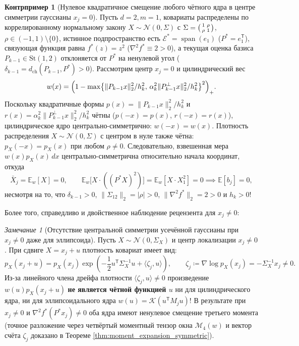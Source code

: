 \documentclass[11pt,a4paper]{article}
\newcommand{\E}{\mathbb{E}}
\newcommand{\T}{^{\mathsf{T}}}
\newcommand{\St}{\mathrm{St}}
\newcommand{\Kern}{\mathcal{K}}
\newcommand{\PEDRs}{P^{*}}
\DeclareMathOperator{\spanop}{span}
\theoremstyle{definition}
\newtheorem{counterexample}[theorem]{Контрпример}
\theoremstyle{remark}
\newtheorem{remark}[theorem]{Замечание}
\begin{document}
\begin{counterexample}[Нулевое квадратичное смещение любого чётного ядра в центре симметрии гауссианы $x_j = 0$]\label{cex:cyl_zero_bias}
Пусть $d = 2, m = 1$, ковариаты распределены по коррелированному нормальному закону $X \sim \mathcal{N}(0, \Sigma)$ с $\Sigma = \begin{psmallmatrix} 1 & \rho \\ \rho & 1 \end{psmallmatrix}$, $\rho \in (-1, 1) \setminus \{0\}$, истинное подпространство есть $\mathcal{E}^* = \spanop(e_1)$ ($\PEDRs = e_1\T$), связующая функция равна $f^*(z) = z^2$ ($\nabla^2 f^* \equiv 2 > 0$), а текущая оценка базиса $P_{k-1} \in \St(1,2)$ отклоняется от $\PEDRs$ на ненулевой угол ($\delta_{k-1} = d_{\mathrm{ch}}(P_{k-1}, \PEDRs) > 0$). Рассмотрим центр $x_j = 0$ и цилиндрический вес
\[
    w(x) = \Bigl(1 - \max\bigl\{\|P_{k-1}x\|_2^2 / h_k^2, \, \alpha_k^2 \|P_{k-1}^\perp x\|_2^2 / h_k^2\bigr\}^2\Bigr)_+.
\]
Поскольку квадратичные формы $p(x) = \|P_{k-1}x\|_2^2/h_k^2$ и $r(x) = \alpha_k^2\|P_{k-1}^\perp x\|_2^2/h_k^2$ чётны ($p(-x)=p(x)$, $r(-x)=r(x)$), цилиндрическое ядро центрально-симметрично: $w(-x) = w(x)$. Плотность распределения $X \sim \mathcal{N}(0, \Sigma)$ с центром в нуле также чётна: $p_X(-x) = p_X(x)$ при любом $\rho \neq 0$. Следовательно, взвешенная мера $w(x)p_X(x)\,dx$ центрально-симметрична относительно начала координат, откуда
\[
    \bar{X}_j = \E_w[X] = 0, \qquad \E_w\bigl[X \cdot ((\PEDRs X)^2)\bigr] = \E_w[X \cdot X_1^2] = 0 \implies \E[b_j] = 0,
\]
несмотря на то, что $\delta_{k-1} > 0$, $\|\Sigma_{12}\|_2 = |\rho| > 0$, $\|\nabla^2 f^*\|_2 = 2 > 0$ и $h_k > 0$!
\end{counterexample}

Более того, справедливо и двойственное наблюдение рецензента для $x_j \neq 0$:
\begin{remark}[Отсутствие центральной симметрии усечённой гауссианы при $x_j \neq 0$ даже для эллипсоида]
Пусть $X \sim \mathcal{N}(0, \Sigma_X)$ и центр локализации $x_j \neq 0$. При сдвиге $X = x_j + u$ плотность ковариат имеет вид:
\begin{equation}\label{eq:shifted_gaussian_density}
    p_X(x_j + u) = p_X(x_j) \exp\left(-\frac{1}{2}u\T \Sigma_X^{-1} u + \langle \zeta_j, u \rangle\right), \qquad \zeta_j \coloneqq \nabla \log p_X(x_j) = -\Sigma_X^{-1} x_j \neq 0.
\end{equation}
Из-за линейного члена дрейфа плотности $\langle \zeta_j, u \rangle \neq 0$ произведение $w(u) p_X(x_j + u)$ \textbf{не является чётной функцией $u$} ни для цилиндрического ядра, ни для эллипсоидального ядра $w(u) = \Kern(u\T M_j u)$! В результате при $x_j \neq 0$ и $\nabla^2 f^*(\PEDRs x_j) \neq 0$ оба ядра имеют ненулевое смещение третьего момента (точное разложение через четвёртый моментный тензор окна $\mathcal{M}_4(w)$ и вектор счёта $\zeta_j$ доказано в Теореме \ref{thm:moment_expansion_symmetric}).
\end{remark}
\end{document}
